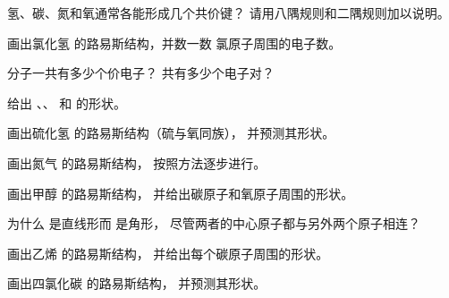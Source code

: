 \begin{exercise}[$\star$]\label{exo:g10:lewis-and-shape:2}
氢、碳、氮和氧通常各能形成几个共价键？
请用八隅规则和二隅规则加以说明。
\end{exercise}

\begin{exercise}[$\star$]\label{exo:g10:lewis-and-shape:3}
画出氯化氢  的路易斯结构，并数一数
氯原子周围的电子数。
\end{exercise}

\begin{exercise}[$\star$]\label{exo:g10:lewis-and-shape:4}
 分子一共有多少个价电子？
共有多少个电子对？
\end{exercise}

\begin{exercise}[$\star$]\label{exo:g10:lewis-and-shape:5}
给出 、、 和  的形状。
\end{exercise}

\begin{exercise}[$\star\star$]\label{exo:g10:lewis-and-shape:6}
画出硫化氢  的路易斯结构（硫与氧同族），
并预测其形状。
\end{exercise}

\begin{exercise}[$\star\star$]\label{exo:g10:lewis-and-shape:7}
画出氮气  的路易斯结构，
按照方法逐步进行。
\end{exercise}

\begin{exercise}[$\star\star$]\label{exo:g10:lewis-and-shape:8}
画出甲醇  的路易斯结构，
并给出碳原子和氧原子周围的形状。
\end{exercise}

\begin{exercise}[$\star\star$]\label{exo:g10:lewis-and-shape:9}
为什么  是直线形而  是角形，
尽管两者的中心原子都与另外两个原子相连？
\end{exercise}

\begin{exercise}[$\star\star$]\label{exo:g10:lewis-and-shape:10}
画出乙烯  的路易斯结构，
并给出每个碳原子周围的形状。
\end{exercise}

\begin{exercise}[$\star\star$]\label{exo:g10:lewis-and-shape:11}
画出四氯化碳  的路易斯结构，
并预测其形状。
\end{exercise}


